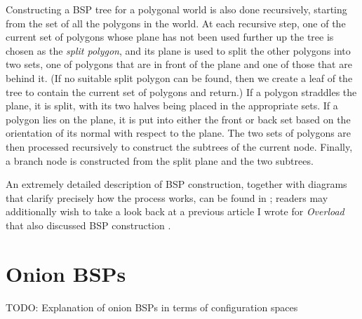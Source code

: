 \documentclass[10pt,twocolumn]{article}
\begin{document}
Constructing a BSP tree for a polygonal world is also done recursively, starting from the set of all the polygons in the world. At each recursive step, one of the current set of polygons whose plane has not been used further up the tree is chosen as the \emph{split polygon}, and its plane is used to split the other polygons into two sets, one of polygons that are in front of the plane and one of those that are behind it. (If no suitable split polygon can be found, then we create a leaf of the tree to contain the current set of polygons and return.) If a polygon straddles the plane, it is split, with its two halves being placed in the appropriate sets. If a polygon lies on the plane, it is put into either the front or back set based on the orientation of its normal with respect to the plane. The two sets of polygons are then processed recursively to construct the subtrees of the current node. Finally, a branch node is constructed from the split plane and the two subtrees.

An extremely detailed description of BSP construction, together with diagrams that clarify precisely how the process works, can be found in \cite{golodetz06}; readers may additionally wish to take a look back at a previous article I wrote for \emph{Overload} that also discussed BSP construction \cite{golodetzoverload08aug}.

\section{Onion BSPs}
\label{sec:onionbsps}

TODO: Explanation of onion BSPs in terms of configuration spaces
\end{document}
